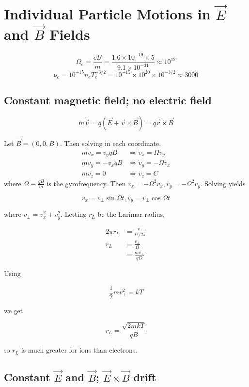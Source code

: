 \documentclass[12pt]{article}
\begin{document}
\section{Individual Particle Motions in $\vec E$ and $\vec B$ Fields}

$$\Omega_e = \frac{eB}{m} = \frac{1.6 \times 10^{-19} \times 5}{9.1 \times 10^{-31}} \approx 10^{12}$$
$$\nu_e = 10^{-15}n_eT_e^{-3/2} = 10^{-15} \times 10^{20} \times 10^{-3/2} \approx 3000$$

\subsection{Constant magnetic field; no electric field}

$$m\dot{\vec v} = q(\vec E + \vec v \times \vec B) = q\vec v \times \vec B$$

Let $\vec B = (0, 0, B)$. Then solving in each coordinate,
\begin{align*}
    m\dot v_x = v_y qB &\Rightarrow \dot v_x = \Omega v_y \\
    m\dot v_y = -v_xqB &\Rightarrow \dot v_y = -\Omega v_x \\
    m\dot v_z = 0 &\Rightarrow v_z = C
\end{align*}
where $\Omega \equiv \frac{qB}{m}$ is the gyrofrequency. Then $\ddot{v_x} = -\Omega^2v_x, \ddot{v_y} = -\Omega^2v_y$. Solving yields

$$v_x = v_\perp\sin\Omega t, v_y = v_\perp\cos\Omega t$$

where $v_\perp = v_x^2 + v_y^2$. Letting $r_L$ be the Larimar radius,

\begin{align*}
    2\pi r_L &= \frac{v_\perp}{\Omega/2\pi} \\
    r_L &= \frac{v_\perp}{\Omega} \\
        &= \frac{mv_\perp}{qD}
\end{align*}

Using

$$\frac{1}{2}mv_\perp^2 = kT$$

we get

$$r_L = \frac{\sqrt{2mkT}}{qB}$$

so $r_L$ is much greater for ions than electrons.

\subsection{Constant $\vec E$ and $\vec B$; $\vec E \times \vec B$ drift}
\end{document}
